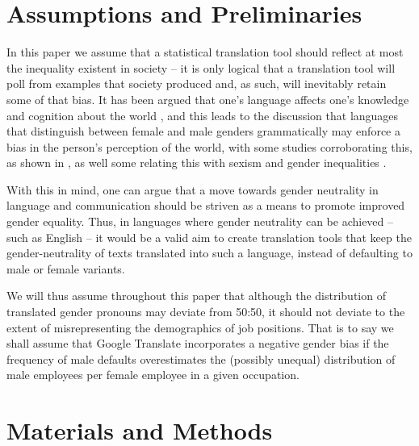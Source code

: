 \documentclass[fleqn,10pt]{article}
\begin{document}
\section{Assumptions and Preliminaries}

In this paper we assume that a statistical translation tool should reflect at most the inequality existent in society -- it is only logical that a translation tool will poll from examples that  society produced and, as such, will inevitably retain some of that bias. It has been argued that one's language affects one's knowledge and cognition about the world \citep{kay1984sapir}, and this leads to the discussion that languages that distinguish between female and male genders grammatically may enforce a bias in the person's perception of the world, with some studies corroborating this, as shown in \citep{boroditsky2003sex}, as well some relating this with sexism \citep{thompson2014linguistic} and gender inequalities \citep{santacreu2013female}.

With this in mind, one can argue that a move towards gender neutrality in language and communication should be striven as a means to promote improved gender equality. Thus, in languages where gender neutrality can be achieved -- such as English -- it would be a valid aim to create translation tools that keep the gender-neutrality of texts translated into such a language, instead of defaulting to male or female variants.

We will thus assume throughout this paper that although the distribution of translated gender pronouns may deviate from 50:50, it should not deviate to the extent of misrepresenting the demographics of job positions. That is to say we shall assume that Google Translate incorporates a negative gender bias if the frequency of male defaults overestimates the (possibly unequal) distribution of male employees per female employee in a given occupation.

\section{Materials and Methods}
\end{document}
